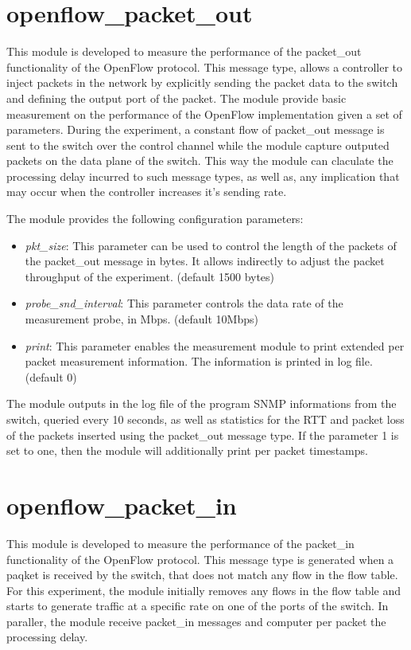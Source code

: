\documentclass{book}
\begin{document}
\section{openflow\_packet\_out}

This module is developed to measure the performance of the packet\_out
functionality of the OpenFlow protocol. This message type, allows a
controller to inject packets in the network by explicitly sending the packet
data to the switch and defining the output port of the packet. The module
provide basic measurement on the performance of the OpenFlow implementation
given a set of parameters. During the experiment, a constant flow of packet\_out
message is sent to the switch over
the control channel while the module capture outputed packets on the data plane of the
switch. This way the module can claculate the processing delay incurred to such
message types, as well as, any implication that may occur when the controller
increases it's sending rate. 

The module provides the following configuration parameters:
\begin{itemize}
\item \emph{pkt\_size}:  This parameter can be used to control the length of the
packets of the packet\_out message in bytes. It allows indirectly to adjust the packet
throughput of the experiment. (default 1500 bytes)
\item \emph{probe\_snd\_interval}: This parameter controls the data rate of the 
measurement probe, in Mbps. (default 10Mbps)
\item \emph{print}: This parameter enables the measurement module to print
extended per packet measurement information. The information is printed in log
file. (default 0)
\end{itemize}

The module outputs in the log file of the program SNMP informations from the switch, queried
every 10 seconds, as well as statistics for the RTT and packet loss of the
packets inserted using the packet\_out message type. If the parameter 1 is set
to one, then the module will additionally print per packet timestamps. 

\section{openflow\_packet\_in}

This module is developed to measure the performance of the packet\_in
functionality of the OpenFlow protocol. This message type is generated when a
paqket is received by the switch, that does not match any flow in the flow
table. For this experiment, the module initially removes any flows in the flow table and starts
to generate traffic at a specific rate on one of the ports of the switch. 
In paraller, the module receive packet\_in messages and computer per packet the
processing delay.
\end{document}
